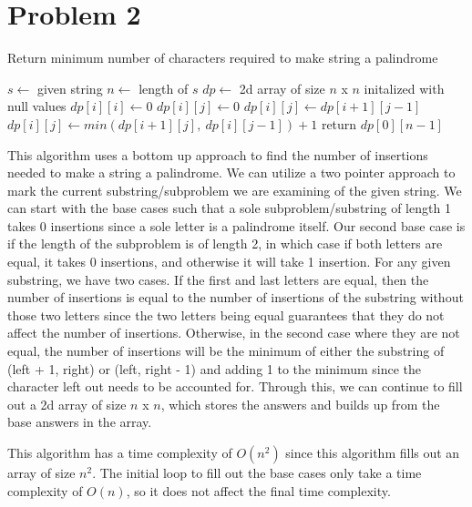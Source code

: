 \documentclass[12pt]{article}
\begin{document}
\newpage
\section*{Problem 2}
\begin{algorithm}
\caption{Return minimum number of characters required to make string a palindrome}
\begin{algorithmic}[1]
    \State $s \gets $ given string
    \State $n \gets $ length of $s$
    \State $dp \gets $ 2d array of size $n$ x $n$ initalized with null values
        \State $dp[i][i] \gets 0$
    \EndFor
                    \State $dp[i][j] \gets 0$
                \Else
                    \State $dp[i][j] \gets dp[i + 1][j - 1]$
                \EndIf
            \Else
                \State $dp[i][j] \gets min(dp[i+1][j],\ dp[i][j-1]) + 1$
            \EndIf
        \EndFor
    \EndFor
    \State return $dp[0][n - 1]$
\end{algorithmic}
\end{algorithm}
This algorithm uses a bottom up approach to find the number of insertions needed to make a string
a palindrome. We can utilize a two pointer approach to mark the current substring/subproblem we are 
examining of the given string. We can start with the base cases such that a sole subproblem/substring of 
length 1 takes 0 insertions since a sole letter is a palindrome itself. Our second base case is if the length
of the subproblem is of length 2, in which case if both letters are equal, it takes 0 insertions, and otherwise
it will take 1 insertion. For any given substring, we have two cases. If the first and last letters are equal, 
then the number of insertions is equal to the number of insertions of the substring without those two letters 
since the two letters being equal guarantees that they do not affect the number of insertions. Otherwise, 
in the second case where they are not equal, the number of insertions will be the minimum of either 
the substring of (left + 1, right) or (left, right - 1) and adding 1 to the minimum since the character left out
needs to be accounted for. Through this, we can continue to fill out a 2d array of size $n$ x $n$, which stores
the answers and builds up from the base answers in the array.
\newline

This algorithm has a time complexity of $O(n^2)$ since this algorithm fills out an array of 
size $n^2$. The initial loop to fill out the base cases only take a time complexity of $O(n)$, so it does not affect 
the final time complexity.
\end{document}
